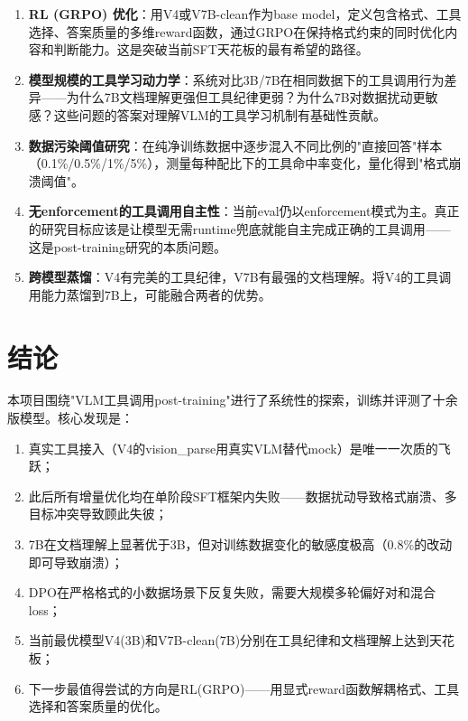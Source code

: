 \documentclass[fontset=none,11pt,a4paper]{ctexart}
\begin{document}
\begin{enumerate}[label=\textbf{\arabic*}. , leftmargin=*]

\item \textbf{RL (GRPO) 优化}：用V4或V7B-clean作为base model，定义包含格式、工具选择、答案质量的多维reward函数，通过GRPO在保持格式约束的同时优化内容和判断能力。这是突破当前SFT天花板的最有希望的路径。

\item \textbf{模型规模的工具学习动力学}：系统对比3B/7B在相同数据下的工具调用行为差异------为什么7B文档理解更强但工具纪律更弱？为什么7B对数据扰动更敏感？这些问题的答案对理解VLM的工具学习机制有基础性贡献。

\item \textbf{数据污染阈值研究}：在纯净训练数据中逐步混入不同比例的"直接回答"样本（0.1\%/0.5\%/1\%/5\%），测量每种配比下的工具命中率变化，量化得到"格式崩溃阈值"。

\item \textbf{无enforcement的工具调用自主性}：当前eval仍以enforcement模式为主。真正的研究目标应该是让模型无需runtime兜底就能自主完成正确的工具调用------这是post-training研究的本质问题。

\item \textbf{跨模型蒸馏}：V4有完美的工具纪律，V7B有最强的文档理解。将V4的工具调用能力蒸馏到7B上，可能融合两者的优势。

\end{enumerate}

\section{结论}

本项目围绕"VLM工具调用post-training"进行了系统性的探索，训练并评测了十余版模型。核心发现是：

\begin{enumerate}[nosep]
    \item 真实工具接入（V4的vision\_parse用真实VLM替代mock）是唯一一次质的飞跃；
    \item 此后所有增量优化均在单阶段SFT框架内失败------数据扰动导致格式崩溃、多目标冲突导致顾此失彼；
    \item 7B在文档理解上显著优于3B，但对训练数据变化的敏感度极高（0.8\%的改动即可导致崩溃）；
    \item DPO在严格格式的小数据场景下反复失败，需要大规模多轮偏好对和混合loss；
    \item 当前最优模型V4(3B)和V7B-clean(7B)分别在工具纪律和文档理解上达到天花板；
    \item 下一步最值得尝试的方向是RL(GRPO)------用显式reward函数解耦格式、工具选择和答案质量的优化。
\end{enumerate}
\end{document}
